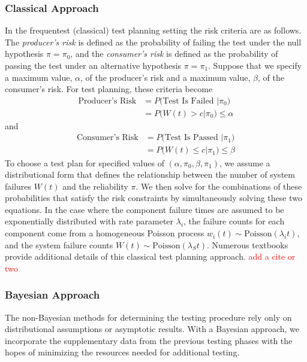 \documentclass[12pt]{article}
\begin{document}
\subsubsection{Classical Approach}
In the frequentest (classical) test planning setting the risk criteria
are as follows. The \emph{producer's risk} is defined as the probability of
failing the test under the null hypothesis $\pi = \pi_0$, and the
\emph{consumer's risk} is defined as the probability of passing the test under an
alternative hypothesis $\pi = \pi_1$.  Suppose that we specify a maximum value,
$\alpha$, of the producer's risk and a maximum value, $\beta$, of the consumer's
risk. For test planning, these criteria become
$$
\begin{aligned}
	\text{Producer's Risk} &= P \text{(Test Is Failed } \vert \pi_0 \text{)} \\ &=
	P \text{(} W(t) > c \vert \pi_0 \text{)} \leq \alpha
\end{aligned}
$$
and
$$
\begin{aligned}
	\text{Consumer's Risk} &= P \text{(Test Is Passed } \vert \pi_1 \text{)} \\ &=
	P \text{(} W(t) \leq c \vert \pi_1 \text{)} \leq \beta
\end{aligned}
$$
To choose a test plan for specified values of $(\alpha, \pi_0, \beta, \pi_1)$,
we assume a distributional form that defines the relationship between the number
of system failures $W(t)$ and the reliability $\pi$.  We then solve for
the combinations of these probabilities that satisfy the risk constraints by simultaneously solving these two
equations.  In the case where the component failure times are assumed to be
exponentially distributed with rate parameter $\lambda_i$, the failure counts for
each component come from a homogeneous Poisson process $w_i(t) \sim
\text{Poisson}(\lambda_i t)$, and the system failure counts $W(t) \sim
\text{Poisson}(\lambda_S t)$.  Numerous textbooks provide additional details of
this classical test planning approach. \textcolor{red}{add a cite or two}

\subsubsection{Bayesian Approach}
The non-Bayesian methods for determining the testing procedure rely only on distributional assumptions or asymptotic results. With a Bayesian approach, we
incorporate the supplementary data from the previous testing phases with the
hopes of minimizing the resources needed for additional testing.
\end{document}
